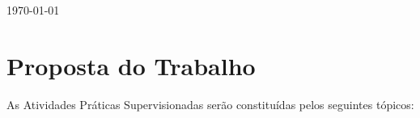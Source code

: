 \documentclass[12pt]{article}
\begin{document}
\begin{titlepage}
%



{\large \today}\\[2cm] %

\vfill %

\end{titlepage}



\tableofcontents


\section{Proposta do Trabalho}

As Atividades Práticas Supervisionadas serão constituídas pelos seguintes tópicos:

\renewcommand{\labelenumi}{\arabic{enumi})}
\renewcommand{\labelenumii}{\alph{enumii}.}
\end{document}
